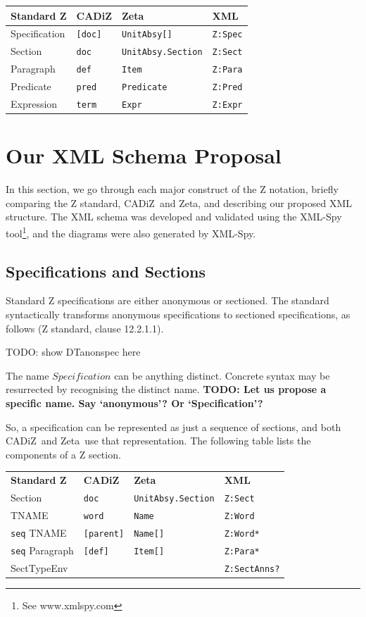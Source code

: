 \documentclass{llncs}  %
\newcommand{\AFont}[1]{\texttt{#1}}
\newcommand{\CADiZ}{CADiZ}
\newcommand{\Zeta}{Zeta}
\newcommand{\ASpecification}{Specification}
\newcommand{\ASection}{Section}
\newcommand{\AParagraph}{Paragraph}
\newcommand{\APredicate}{Predicate}
\newcommand{\AExpression}{Expression}
\newcommand{\TNAME}{TNAME}
\newcommand{\ASectTypeEnv}{SectTypeEnv}
\newcommand{\DTanonspec}{\par TODO: show DTanonspec here \par}
\newcommand{\TODO}[1]{\textbf{TODO: #1}}   %
\begin{document}
\begin{center}
\begin{tabular}{|l|l|l|l|}
\hline
{\bf Standard Z} & {\bf \CADiZ} & {\bf \Zeta} & {\bf XML}\\
\hline
\ASpecification & \AFont{[doc]} & \AFont{UnitAbsy[]} & \AFont{Z:Spec}\\
\ASection & \AFont{doc} & \AFont{UnitAbsy.Section} & \AFont{Z:Sect}\\
\AParagraph & \AFont{def} & \AFont{Item} & \AFont{Z:Para}\\
\APredicate & \AFont{pred} & \AFont{Predicate} & \AFont{Z:Pred}\\
\AExpression & \AFont{term} & \AFont{Expr} & \AFont{Z:Expr}\\
\hline
\end{tabular}
\end{center}


\section{Our XML Schema Proposal}

In this section, we go through each major construct of the
Z notation, briefly comparing the Z standard, \CADiZ\ and \Zeta,
and describing our proposed XML structure.  The XML schema was
developed and validated using the XML-Spy tool\footnote{See
  www.xmlspy.com}, and the diagrams were also generated by XML-Spy.

\subsection{Specifications and Sections}\label{Specification}

Standard Z specifications are either anonymous or sectioned.
The standard syntactically transforms anonymous specifications
to sectioned specifications, as follows (Z standard, clause 12.2.1.1).
\DTanonspec
The name $Specification$ can be anything distinct.
Concrete syntax may be resurrected by recognising the distinct name.
\TODO{Let us propose a specific name.  Say `anonymous'?  Or
  `Specification'?}

So, a specification can be represented as just a sequence of sections,
and both \CADiZ\ and \Zeta\ use that representation.
The following table lists the components of a Z section.
\begin{center}
\begin{tabular}{|l|l|l|l|}
\hline
{\bf Standard Z} & {\bf \CADiZ} & {\bf \Zeta} & {\bf XML}\\
\ASection & \AFont{doc} & \AFont{UnitAbsy.Section} & \AFont{Z:Sect}\\
\hline
\TNAME & \AFont{word} & \AFont{Name} & \AFont{Z:Word}\\
\AFont{seq} \TNAME & \AFont{[parent]} & \AFont{Name[]} & \AFont{Z:Word*}\\
\AFont{seq} \AParagraph & \AFont{[def]} & \AFont{Item[]} & \AFont{Z:Para*}\\
\ASectTypeEnv & & & \AFont{Z:SectAnns?}\\
\hline
\end{tabular}
\end{center}
\end{document}
